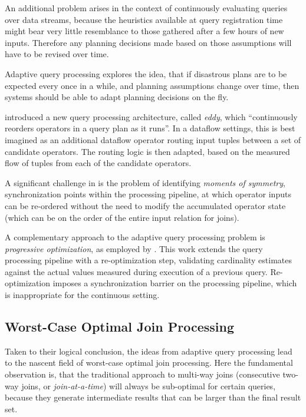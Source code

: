 \documentclass[../index.tex]{subfiles}
\begin{document}
An additional problem arises in the context of continuously evaluating
queries over data streams, because the heuristics available at query
registration time might bear very little resemblance to those gathered
after a few hours of new inputs. Therefore any planning decisions made
based on those assumptions will have to be revised over time.

Adaptive query processing explores the idea, that if disastrous plans
are to be expected every once in a while, and planning assumptions
change over time, then systems should be able to adapt planning
decisions on the fly.

\cite{avnur2000eddies} introduced a new query processing architecture,
called \emph{eddy}, which ``continuously reorders operators in a query
plan as it runs''. In a dataflow settings, this is best imagined as an
additional dataflow operator routing input tuples between a set of
candidate operators. The routing logic is then adapted, based on the
measured flow of tuples from each of the candidate operators.

A significant challenge in \cite{avnur2000eddies} is the problem of
identifying \emph{moments of symmetry}, synchronization points within
the processing pipeline, at which operator inputs can be re-ordered
without the need to modify the accumulated operator state (which can
be on the order of the entire input relation for joins).

A complementary approach to the adaptive query processing problem is
\emph{progressive optimization}, as employed by
\cite{markl2004robust}. This work extends the query processing
pipeline with a re-optimization step, validating cardinality estimates
against the actual values measured during execution of a previous
query. Re-optimization imposes a synchronization barrier on the
processing pipeline, which is inappropriate for the continuous
setting.

\subsection{Worst-Case Optimal Join Processing} \label{technique-wco}

Taken to their logical conclusion, the ideas from adaptive query
processing lead to the nascent field of worst-case optimal join
processing. Here the fundamental observation is, that the traditional
approach to multi-way joins (consecutive two-way joins, or
\emph{join-at-a-time}) will always be sub-optimal for certain queries,
because they generate intermediate results that can be larger than the
final result set.
\end{document}
